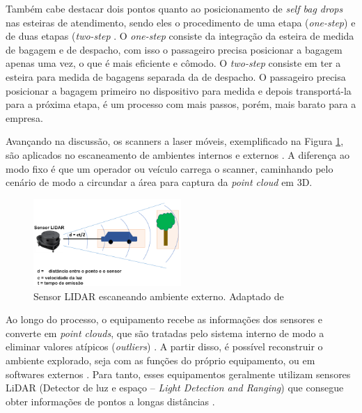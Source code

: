     
    Também cabe destacar dois pontos quanto ao posicionamento de \textit{self bag drops} nas esteiras de atendimento, sendo eles o procedimento de uma etapa (\textit{one-step}) e de duas etapas (\textit{two-step} \cite{neale_2017_automated}. O \textit{one-step} consiste da integração da esteira de medida de bagagem e de despacho, com isso o passageiro precisa posicionar a bagagem apenas uma vez, o que é mais eficiente e cômodo. O \textit{two-step} consiste em ter a esteira para medida de bagagens separada da de despacho. O passageiro precisa posicionar a bagagem primeiro no dispositivo para medida e depois transportá-la para a próxima etapa, é um processo com mais passos, porém, mais barato para a empresa. 
    
    Avançando na discussão, os scanners a laser móveis, exemplificado na Figura \ref{fig:Sensor LIDAR escaneando ambiente externo}, são aplicados no escaneamento de ambientes internos e externos \cite{zhang_2018_a}. A diferença ao modo fixo é que um operador ou veículo carrega o scanner, caminhando pelo cenário de modo a circundar a área para captura da \textit{point cloud} em 3D. 
    
        \begin{figure}[h]
           \centering
           \includegraphics[width=0.5\textwidth]{imagens/Lidar_Sensor_metod.png} 
           \caption{Sensor LIDAR escaneando ambiente externo. Adaptado de \cite{mathworks_2022_introduction}}
           \label{fig:Sensor LIDAR escaneando ambiente externo}
        \end{figure}

    Ao longo do processo, o equipamento recebe as informações dos sensores e converte em \textit{point clouds}, que são tratadas pelo sistema interno de modo a eliminar valores atípicos (\textit{outliers}) \cite{xu_2021_lidar}. A partir disso, é possível reconstruir o ambiente explorado, seja com as funções do próprio equipamento, ou em softwares externos \cite{xu_2021_lidar, zhang_2018_a}. Para tanto, esses equipamentos geralmente utilizam sensores LiDAR (Detector de luz e espaço – \textit{Light Detection and Ranging}) que consegue obter informações de pontos a longas distâncias \cite{zhou_2019_extracting}.


